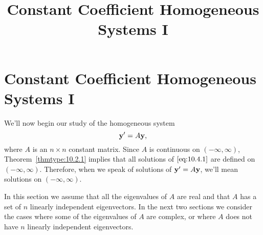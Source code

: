 \documentclass{ximera}
\title{Constant Coefficient Homogeneous Systems I}%
\begin{document}
\begin{abstract}

\end{abstract}

\maketitle

\section*{Constant Coefficient Homogeneous Systems I}

We'll now begin our study of the homogeneous system
\begin{equation}\label{eq:10.4.1}
{\bf y}'=A{\bf y},
\end{equation}
where $A$ is an $n\times n$ constant matrix. Since $A$ is continuous
on $(-\infty,\infty)$, Theorem~\ref{thmtype:10.2.1}
implies
that all solutions of $\eqref{eq:10.4.1}$ are defined on $(-\infty,\infty)$.
Therefore, when we speak of solutions of ${\bf y}'=A{\bf y}$, we'll
mean solutions on $(-\infty,\infty)$.

In this section we assume that all the eigenvalues of $A$ are real and
that $A$ has a set of $n$ linearly independent eigenvectors. In the
next two sections we consider the cases where some of the eigenvalues
of $A$ are complex, or where $A$ does not have $n$ linearly
independent eigenvectors.
\end{document}
